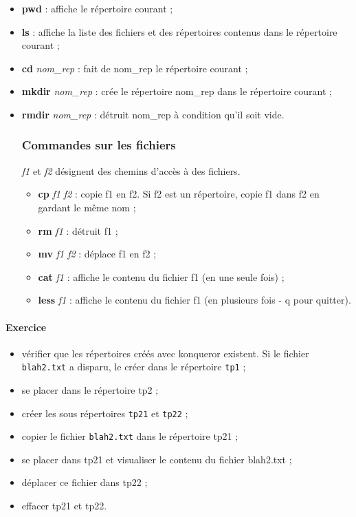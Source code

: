 \documentclass[12pt,a4paper]{article}
\begin{document}
\begin{itemize}
\item {\bf pwd} : affiche le répertoire courant ;
\item {\bf ls} : affiche la liste des fichiers et des répertoires
  contenus dans le répertoire courant ;
\item {\bf cd} {\it nom\_rep} : fait de nom\_rep le répertoire courant ;
\item {\bf mkdir} {\it nom\_rep} : crée le répertoire nom\_rep dans le
  répertoire courant ;
\item {\bf rmdir} {\it nom\_rep} : détruit nom\_rep à condition qu'il soit
  vide.  

\subsubsection{Commandes sur les fichiers}
{\it f1} et {\it f2} désignent des chemins d'accès à des fichiers.
\begin{itemize}
\item {\bf cp} {\it f1 f2} : copie f1 en f2. Si f2 est un répertoire, copie
  f1 dans f2 en gardant le même nom ;
\item {\bf rm} {\it f1} : détruit f1 ;
\item {\bf mv} {\it f1 f2} : déplace f1 en f2 ;
\item {\bf cat} {\it f1} : affiche le contenu du fichier f1 (en une seule fois) ;
\item {\bf less} {\it f1} : affiche le contenu du fichier f1 (en plusieurs fois -
  q pour quitter).
\end{itemize}
\end{itemize}

\paragraph{Exercice}
\begin{itemize}
\item vérifier que les répertoires créés avec konqueror
  existent. Si le fichier {\tt blah2.txt} a
  disparu, le créer dans le répertoire {\tt tp1} ;
\item se placer dans le répertoire tp2 ;
\item créer les sous répertoires {\tt tp21} et {\tt tp22} ;
\item copier le fichier {\tt blah2.txt} dans le répertoire tp21 ;
\item se placer dans tp21 et visualiser le contenu du fichier
  blah2.txt ;
\item déplacer ce fichier dans tp22 ;
\item effacer tp21 et tp22.
\end{itemize}
\end{document}
